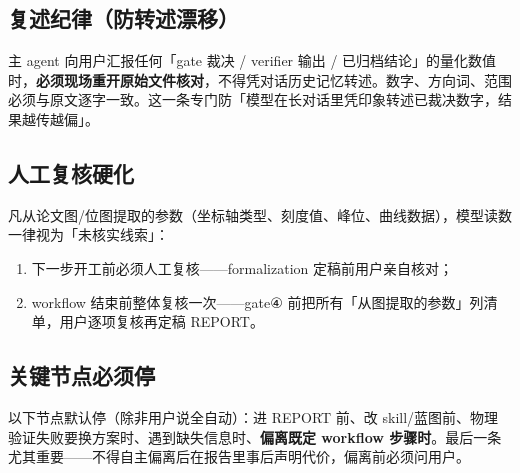 \subsection{复述纪律（防转述漂移）}

主 agent 向用户汇报任何「gate 裁决 / verifier 输出 / 已归档结论」的量化数值时，\textbf{必须现场重开原始文件核对}，不得凭对话历史记忆转述。数字、方向词、范围必须与原文逐字一致。这一条专门防「模型在长对话里凭印象转述已裁决数字，结果越传越偏」。

\subsection{人工复核硬化}

凡从论文图/位图提取的参数（坐标轴类型、刻度值、峰位、曲线数据），模型读数一律视为「未核实线索」：

\begin{enumerate}
  \item 下一步开工前必须人工复核——formalization 定稿前用户亲自核对；
  \item workflow 结束前整体复核一次——gate④ 前把所有「从图提取的参数」列清单，用户逐项复核再定稿 REPORT。
\end{enumerate}

\subsection{关键节点必须停}

以下节点默认停（除非用户说全自动）：进 REPORT 前、改 skill/蓝图前、物理验证失败要换方案时、遇到缺失信息时、\textbf{偏离既定 workflow 步骤时}。最后一条尤其重要——不得自主偏离后在报告里事后声明代价，偏离前必须问用户。
